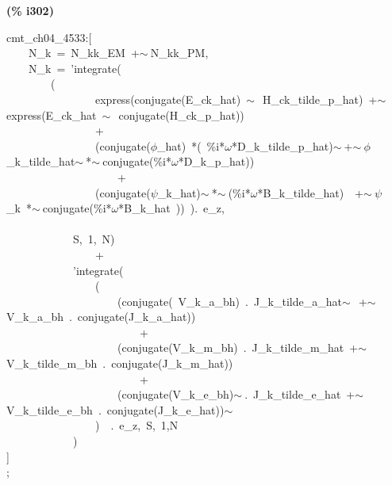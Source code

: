 \documentclass[fleqn]{article}
\begin{document}
\noindent
\begin{minipage}[t]{4.000000em}\color{red}\bfseries
(\% i302)	
\end{minipage}
\begin{minipage}[t]{\textwidth}\color{blue}
cmt\_ch04\_4533:[\\
\ \ \ \ N\_k\ =\ N\_kk\_EM\ +\ensuremath{\sim\ }N\_kk\_PM,\\
\ \ \ \ N\_k\ =\ 'integrate(\ \\
\ \ \ \ \ \ \ \ (\\
\ \ \ \ \ \ \ \ \ \ \ \ \ \ \ \ express(conjugate(E\_ck\_hat)\ \ensuremath{\sim\ }\ H\_ck\_tilde\_p\_hat)\ +\ensuremath{\sim\ }express(E\_ck\_hat\ \ensuremath{\sim\ }\ conjugate(H\_ck\_p\_hat))\\
\ \ \ \ \ \ \ \ \ \ \ \ \ \ \ \ +\\
\ \ \ \ \ \ \ \ \ \ \ \ \ \ \ \ (conjugate(\ensuremath{\phi}\_hat)\ *(\ \%i*\ensuremath{\omega}*D\_k\_tilde\_p\_hat)\ensuremath{\sim\ }+\ensuremath{\sim\ }\ensuremath{\phi}\_k\_tilde\_hat\ensuremath{\sim\ }*\ensuremath{\sim\ }conjugate(\%i*\ensuremath{\omega}*D\_k\_p\_hat))\ \\
\ \ \ \ \ \ \ \ \ \ \ \ \ \ \ \ \ \ \ \ +\\
\ \ \ \ \ \ \ \ \ \ \ \ \ \ \ \ (conjugate(\ensuremath{\psi}\_k\_hat)\ensuremath{\sim\ }*\ensuremath{\sim\ }(\%i*\ensuremath{\omega}*B\_k\_tilde\_hat)\ \ +\ensuremath{\sim\ }\ensuremath{\psi}\_k\ *\ensuremath{\sim\ }conjugate(\%i*\ensuremath{\omega}*B\_k\_hat\ ))\ ).\ e\_z,\ \\
\ \ \ \ \ \ \ \ \ \ \ \ \ \ \ \ \\
\ \ \ \ \ \ \ \ \ \ \ \ S,\ 1,\ N)\\
\ \ \ \ \ \ \ \ \ \ \ \ \ \ \ \ +\\
\ \ \ \ \ \ \ \ \ \ \ \ 'integrate(\ \\
\ \ \ \ \ \ \ \ \ \ \ \ \ \ \ \ (\\
\ \ \ \ \ \ \ \ \ \ \ \ \ \ \ \ \ \ \ \ (conjugate(\ V\_k\_a\_bh)\ .\ J\_k\_tilde\_a\_hat\ensuremath{\sim\ }\ +\ensuremath{\sim\ }V\_k\_a\_bh\ .\ conjugate(J\_k\_a\_hat))\\
\ \ \ \ \ \ \ \ \ \ \ \ \ \ \ \ \ \ \ \ \ \ \ \ +\\
\ \ \ \ \ \ \ \ \ \ \ \ \ \ \ \ \ \ \ \ (conjugate(V\_k\_m\_bh)\ .\ J\_k\_tilde\_m\_hat\ +\ensuremath{\sim\ }V\_k\_tilde\_m\_bh\ .\ conjugate(J\_k\_m\_hat))\\
\ \ \ \ \ \ \ \ \ \ \ \ \ \ \ \ \ \ \ \ \ \ \ \ +\\
\ \ \ \ \ \ \ \ \ \ \ \ \ \ \ \ \ \ \ \ (conjugate(V\_k\_e\_bh)\ensuremath{\sim\ }.\ J\_k\_tilde\_e\_hat\ +\ensuremath{\sim\ }V\_k\_tilde\_e\_bh\ .\ conjugate(J\_k\_e\_hat))\ensuremath{\sim\ }\\
\ \ \ \ \ \ \ \ \ \ \ \ \ \ \ \ )\ \ .\ e\_z,\ S,\ 1,N\ \ \ \\
\ \ \ \ \ \ \ \ \ \ \ \ )\\
]\\
;
\end{minipage}
\end{document}
